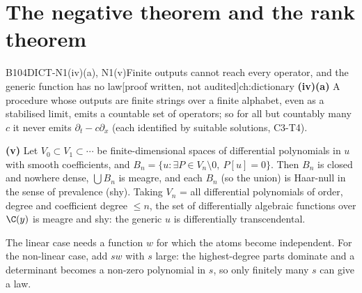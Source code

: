 \documentclass[11pt,a4paper,oneside]{report}
\newcommand{\badge}[2]{\textcolor{#1}{\textsf{\footnotesize[#2]}}}
\newcommand{\pw}{\badge{cD}{proof written, not audited}}
\newenvironment{dimcard}[5]{\par\Needspace{12\baselineskip}\begin{dimcardbox}{#1}{#2}{#3}{#4}{#5}}{\end{dimcardbox}}
\begin{document}
\section{The negative theorem and the rank theorem}

\begin{dimcard}{B104}{DICT-N1(iv)(a), N1(v)}{Finite outputs cannot reach every operator, and the generic function has no law}{\pw}{ch:dictionary}
\textbf{(iv)(a)} A procedure whose outputs are finite strings over a finite alphabet, even as a stabilised limit, emits a countable set of operators; so for all but countably many $c$ it never emits $\partial_t-c\partial_x$ (each identified by suitable solutions, C3-T4).

\textbf{(v)} Let $V_0\subset V_1\subset\cdots$ be finite-dimensional spaces of differential polynomials in $u$ with smooth coefficients, and $B_n=\{u:\exists P\in V_n\setminus0,\ P[u]=0\}$. Then $B_n$ is closed and nowhere dense, $\bigcup B_n$ is meagre, and each $B_n$ (so the union) is Haar-null in the sense of prevalence (shy). Taking $V_n$ = all differential polynomials of order, degree and coefficient degree $\le n$, the set of differentially algebraic functions over $\C(y)$ is meagre and shy: the generic $u$ is differentially transcendental.
\end{dimcard}

\begin{proofidea}
The linear case needs a function $w$ for which the atoms become independent. For the non-linear case, add $sw$ with $s$ large: the highest-degree parts dominate and a determinant becomes a non-zero polynomial in $s$, so only finitely many $s$ can give a law.
\end{proofidea}
\end{document}

